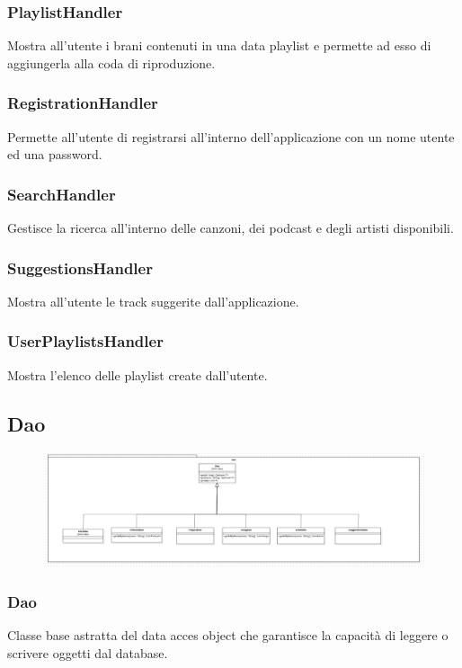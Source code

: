 \documentclass{article}
\begin{document}
  \subsubsection{PlaylistHandler}
  Mostra all'utente i brani contenuti in una data playlist e permette ad esso di
  aggiungerla alla coda di riproduzione.

  \subsubsection{RegistrationHandler}
  Permette all'utente di registrarsi all'interno dell'applicazione con un
  nome utente ed una password.

  \subsubsection{SearchHandler}
  Gestisce la ricerca all'interno delle canzoni, dei podcast e degli artisti disponibili.

  \subsubsection{SuggestionsHandler}
  Mostra all'utente le track suggerite dall'applicazione.

  \subsubsection{UserPlaylistsHandler}
  Mostra l'elenco delle playlist create dall'utente.

  \subsection{Dao}

  \begin{figure}[H]
    \includegraphics[scale=0.3]{dao01}
  \end{figure}

  \subsubsection{Dao}
  Classe base astratta del data acces object che garantisce la capacità di leggere
  o scrivere oggetti dal database.
\end{document}

